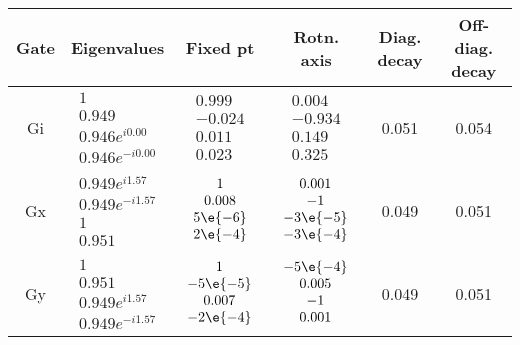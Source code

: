 {\begin{table}[h]
\begin{center}
\begin{tabular}[l]{|c|c|c|c|c|c|}
\hline
Gate & Eigenvalues & Fixed pt & Rotn. axis & Diag. decay & Off-diag. decay \\ \hline
Gi & $ \begin{array}{c}
1 \\ 
0.949 \\ 
0.946e^{i0.00} \\ 
0.946e^{-i0.00}
 \end{array} $
 & $ \begin{array}{c}
0.999 \\ 
-0.024 \\ 
0.011 \\ 
0.023
 \end{array} $
 & $ \begin{array}{c}
0.004 \\ 
-0.934 \\ 
0.149 \\ 
0.325
 \end{array} $
 & 0.051 & 0.054 \\ \hline
Gx & $ \begin{array}{c}
0.949e^{i1.57} \\ 
0.949e^{-i1.57} \\ 
1 \\ 
0.951
 \end{array} $
 & $ \begin{array}{c}
1 \\ 
0.008 \\ 
5\e{-6} \\ 
2\e{-4}
 \end{array} $
 & $ \begin{array}{c}
0.001 \\ 
-1 \\ 
-3\e{-5} \\ 
-3\e{-4}
 \end{array} $
 & 0.049 & 0.051 \\ \hline
Gy & $ \begin{array}{c}
1 \\ 
0.951 \\ 
0.949e^{i1.57} \\ 
0.949e^{-i1.57}
 \end{array} $
 & $ \begin{array}{c}
1 \\ 
-5\e{-5} \\ 
0.007 \\ 
-2\e{-4}
 \end{array} $
 & $ \begin{array}{c}
-5\e{-4} \\ 
0.005 \\ 
-1 \\ 
0.001
 \end{array} $
 & 0.049 & 0.051 \\ \hline
\end{tabular}


\end{center}
\end{table}}
